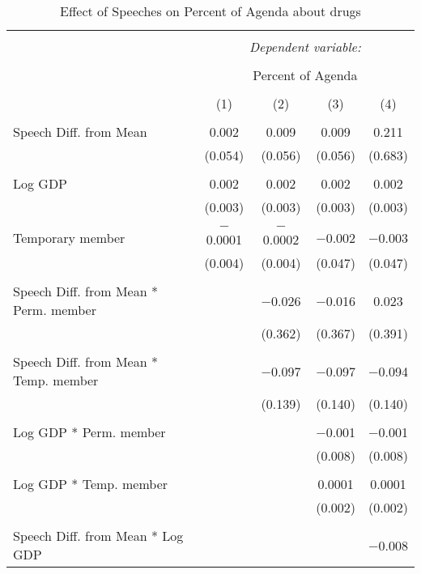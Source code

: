 
\begin{table}[!htbp] \centering 
  \caption{Effect of Speeches on Percent of Agenda about drugs} 
  \label{} 
\begin{tabular}{@{\extracolsep{5pt}}lcccc} 
\\[-1.8ex]\hline 
\hline \\[-1.8ex] 
 & \multicolumn{4}{c}{\textit{Dependent variable:}} \\ 
\cline{2-5} 
\\[-1.8ex] & \multicolumn{4}{c}{Percent of Agenda} \\ 
\\[-1.8ex] & (1) & (2) & (3) & (4)\\ 
\hline \\[-1.8ex] 
 Speech Diff. from Mean & 0.002 & 0.009 & 0.009 & 0.211 \\ 
  & (0.054) & (0.056) & (0.056) & (0.683) \\ 
  & & & & \\ 
 Log GDP & 0.002 & 0.002 & 0.002 & 0.002 \\ 
  & (0.003) & (0.003) & (0.003) & (0.003) \\ 
  & & & & \\ 
 Temporary member & $-$0.0001 & $-$0.0002 & $-$0.002 & $-$0.003 \\ 
  & (0.004) & (0.004) & (0.047) & (0.047) \\ 
  & & & & \\ 
 Speech Diff. from Mean * Perm. member &  & $-$0.026 & $-$0.016 & 0.023 \\ 
  &  & (0.362) & (0.367) & (0.391) \\ 
  & & & & \\ 
 Speech Diff. from Mean * Temp. member &  & $-$0.097 & $-$0.097 & $-$0.094 \\ 
  &  & (0.139) & (0.140) & (0.140) \\ 
  & & & & \\ 
 Log GDP * Perm. member &  &  & $-$0.001 & $-$0.001 \\ 
  &  &  & (0.008) & (0.008) \\ 
  & & & & \\ 
 Log GDP * Temp. member &  &  & 0.0001 & 0.0001 \\ 
  &  &  & (0.002) & (0.002) \\ 
  & & & & \\ 
 Speech Diff. from Mean * Log GDP &  &  &  & $-$0.008 \\ 

\end{tabular}
\end{table}
